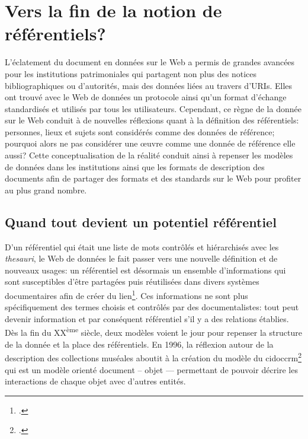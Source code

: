 \section{\label{II-A-3}Vers la fin de la notion de référentiels?}

L'éclatement du document en données sur le Web a permis de grandes avancées pour les institutions patrimoniales qui partagent non plus des notices bibliographiques ou d'autorités, mais des données liées au travers d'URIs. Elles ont trouvé avec le Web de données un protocole ainsi qu'un format d'échange standardisés et utilisés par tous les utilisateurs. Cependant, ce règne de la donnée sur le Web conduit à de nouvelles réflexions quant à la définition des référentiels: personnes, lieux et sujets sont considérés comme des données de référence; pourquoi alors ne pas considérer une œuvre comme une donnée de référence elle aussi? Cette conceptualisation de la réalité conduit ainsi à repenser les modèles de données dans les institutions ainsi que les formats de description des documents afin de partager des formats et des standards sur le Web pour profiter au plus grand nombre.

\subsection{\label{II-A-3-a}Quand tout devient un potentiel référentiel}

D'un référentiel qui était une liste de mots contrôlés et hiérarchisés avec les \textit{thesauri}, le Web de données le fait passer vers une nouvelle définition et de nouveaux usages: un référentiel est désormais un ensemble d'informations qui sont susceptibles d'être partagées puis réutilisées dans divers systèmes documentaires afin de créer du lien\footcite[§49]{bermes_les_2013}. Ces informations ne sont plus spécifiquement des termes choisis et contrôlés par des documentalistes: tout peut devenir information et par conséquent référentiel s'il y a des relations établies.\\

Dès la fin du \textsc{XX}\textsuperscript{ème} siècle, deux modèles voient le jour pour repenser la structure de la donnée et la place des référentiels. En 1996, la réflexion autour de la description des collections muséales aboutit à la création du modèle du \ac{cidoccrm}\footcite{noauthor_cidoc-crm_nodate} qui est un modèle orienté document -- objet --- permettant de pouvoir décrire les interactions de chaque objet avec d'autres entités.\\

